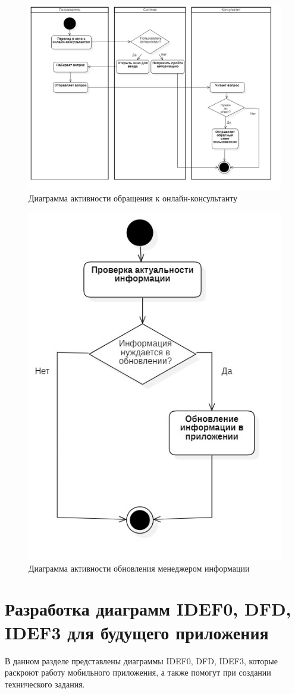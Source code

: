 \documentclass[14pt]{extreport}
\begin{document}
\begin{figure}[H]
\centerline{\includegraphics[width=0.9\linewidth]{act_kons}}
\caption{Диаграмма активности обращения к онлайн-консультанту}
\label{fig7}
\end{figure}

\begin{figure}[H]
\centerline{\includegraphics[width=0.5\linewidth]{act_men}}
\caption{Диаграмма активности обновления менеджером информации}
\label{fig8}
\end{figure}


\newpage
\section{Разработка диаграмм IDEF0, DFD, IDEF3 для будущего
приложения}

В данном разделе представлены диаграммы IDEF0, DFD, IDEF3, которые раскроют работу мобильного приложения, а также помогут при создании технического задания.
\end{document}
